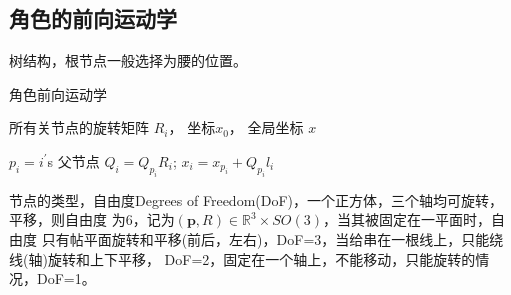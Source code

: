\documentclass[lang=cn,newtx,10pt,scheme=chinese]{elegantbook}
\begin{document}
 

\subsection{角色的前向运动学}
树结构，根节点一般选择为腰的位置。
\begin{algorithm}[h]
  \caption{角色前向运动学}
  \label{alg::FKrootendtree}
  \begin{algorithmic}[1]
    \Require
      所有关节点的旋转矩阵 $R_i$， 坐标$x_0$，
    \Ensure
      全局坐标 $x$
 
        \State $p_i = i^{\prime}$s 父节点
        \State $Q_i = Q_{p_i}R_i$;
        \State $x_i = x_{p_i} + Q_{p_i}l_i$
    \EndFor
  \end{algorithmic}
\end{algorithm}

节点的类型，自由度Degrees of Freedom(DoF)，一个正方体，三个轴均可旋转，平移，则自由度
为6，记为$(\boldsymbol{p}, R)\in \mathbb{R}^3 \times SO(3)$，当其被固定在一平面时，自由度
只有帖平面旋转和平移(前后，左右)，DoF=3，当给串在一根线上，只能绕线(轴)旋转和上下平移，
DoF=2，固定在一个轴上，不能移动，只能旋转的情况，DoF=1。
\end{document}
